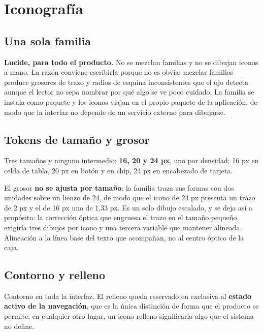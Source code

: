 \section{Iconografía}

\subsection{Una sola familia}

\textbf{Lucide, para todo el producto.} No se mezclan familias y no se dibujan iconos a mano. La razón conviene escribirla porque no es obvia: mezclar familias produce grosores de trazo y radios de esquina inconsistentes que el ojo detecta aunque el lector no sepa nombrar por qué algo se ve poco cuidado. La familia se instala como paquete y los iconos viajan en el propio paquete de la aplicación, de modo que la interfaz no depende de un servicio externo para dibujarse.

\subsection{Tokens de tamaño y grosor}

Tres tamaños y ninguno intermedio: \textbf{16, 20 y 24 px}, uno por densidad: 16 px en celda de tabla, 20 px en botón y en chip, 24 px en encabezado de tarjeta.

\begin{center}
  \muestraTamanosIcono
\end{center}

El grosor \textbf{no se ajusta por tamaño}: la familia traza sus formas con dos unidades sobre un lienzo de 24, de modo que el icono de 24 px presenta un trazo de 2 px y el de 16 px uno de 1{,}33 px. Es un solo dibujo escalado, y se deja así a propósito: la corrección óptica que engruesa el trazo en el tamaño pequeño exigiría tres dibujos por icono y una tercera variable que mantener alineada. Alineación a la línea base del texto que acompañan, no al centro óptico de la caja.

\subsection{Contorno y relleno}

Contorno en toda la interfaz. El relleno queda reservado en exclusiva al \textbf{estado activo de la navegación}, que es la única distinción de forma que el producto se permite; en cualquier otro lugar, un icono relleno significaría algo que el sistema no define.

